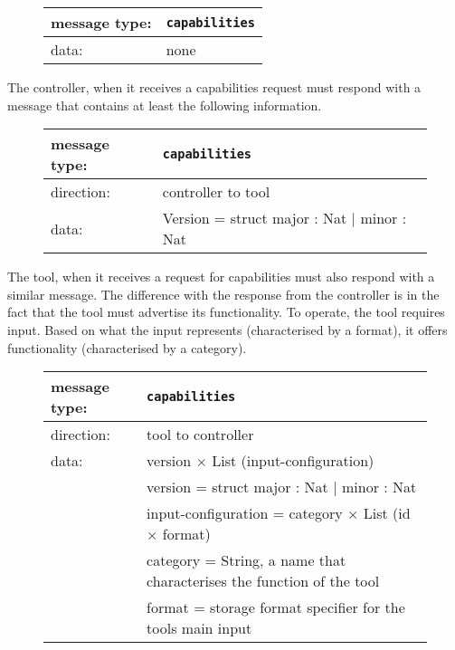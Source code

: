 \documentclass{article}
\newcommand{\msg}[1]{\texttt{#1}}
\begin{document}
   \begin{figure}[H]
    \begin{center}
     \begin{tabular}{|ll|}
      \hline
      message type:    & \msg{capabilities} \\
      \hline
      data:            & none \\
      \hline
     \end{tabular}
    \end{center}
   \end{figure}

   The controller, when it receives a capabilities request must respond with a
   message that contains at least the following information.

   \begin{figure}[H]
    \begin{center}
     \begin{tabular}{|ll|}
      \hline
       message type:   & \msg{capabilities} \\
      \hline
       direction:      & controller to tool \\
       data:           & Version = struct major : Nat $|$ minor : Nat \\
      \hline
     \end{tabular}
    \end{center}
   \end{figure}

   \noindent The tool, when it receives a request for capabilities must also respond with
   a similar message. The difference with the response from the controller is
   in the fact that the tool must advertise its functionality. To operate, the
   tool requires input. Based on what the input represents (characterised by a
   format), it offers functionality (characterised by a category).
   
   \begin{figure}[H]
    \begin{center}
     \begin{tabular}{|ll|}
      \hline
       message type:   & \msg{capabilities} \\
      \hline
       direction:      & tool to controller \\
       data:           & version $\times$ List (input-configuration) \\
                       &  version             = struct major : Nat $|$ minor : Nat \\
                       &  input-configuration = category $\times$ List (id $\times$ format) \\
                       &  category            = String,   a name that characterises the function of the tool \\
                       &  format              = storage format specifier for the tools main input \\
      \hline
     \end{tabular}
    \end{center}
   \end{figure}
\end{document}
